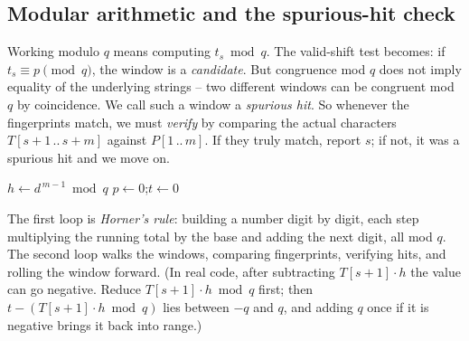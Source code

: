 \subsection{Modular arithmetic and the spurious-hit check}

Working modulo $q$ means computing $t_s \bmod q$. The valid-shift test
becomes: if $t_s \equiv p \pmod q$, the window is a \emph{candidate}. But
congruence mod $q$ does not imply equality of the underlying strings -- two
different windows can be congruent mod $q$ by coincidence. We call such a window
a \emph{spurious hit}. So whenever the fingerprints match, we must \emph{verify}
by comparing the actual characters $T[s+1\,..\,s+m]$ against $P[1\,..\,m]$. If
they truly match, report $s$; if not, it was a spurious hit and we move on.

\begin{algorithm}[H]
\caption{\textsc{Rabin-Karp-Matcher}}
$h \leftarrow d^{\,m-1} \bmod q$ 
$p \leftarrow 0$;\quad $t \leftarrow 0$\;
\end{algorithm}

The first loop is \emph{Horner's rule}: building a number digit by digit, each
step multiplying the running total by the base and adding the next digit, all
mod $q$. The second loop walks the windows, comparing fingerprints, verifying
hits, and rolling the window forward. (In real code, after subtracting
$T[s+1]\cdot h$ the value can go negative. Reduce $T[s+1]\cdot h \bmod q$ first;
then $t - (T[s+1]\cdot h \bmod q)$ lies between $-q$ and $q$, and adding $q$ once
if it is negative brings it back into range.)


